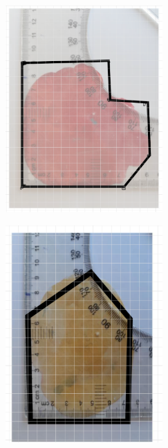 \documentclass[a4paper]{article}
\begin{document}
    \begin{center}
    \begin{minipage}{0.48\textwidth}
        \includegraphics[width=6cm]{Image_1_plot}
    \end{minipage}
    \hfill
    \begin{minipage}{0.48\textwidth}
        \includegraphics[width=6cm]{Image_2_plot}
    \end{minipage}

    \vspace{0.5cm}


\end{center}
\end{document}
